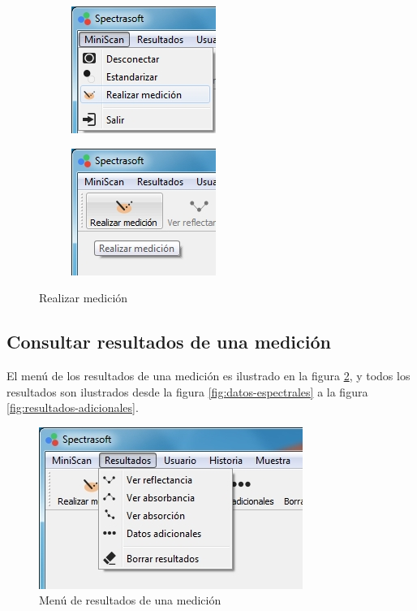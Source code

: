 \begin{figure}[H]
\centering
\begin{subfigure}{.5\textwidth}
  \centering
  \includegraphics[width=.6\linewidth]{./img/medir-menu.jpg}
\end{subfigure}%
\begin{subfigure}{.5\textwidth}
  \centering
  \includegraphics[width=.6\linewidth]{./img/medir-barra.jpg}
\end{subfigure}
\caption[]{Realizar medici\'{o}n\label{fig:medicion}}
\end{figure}

	\subsection*{Consultar resultados de una medici\'{o}n}
	
	El men\'{u} de los resultados de una medici\'{o}n es ilustrado en la figura \ref{fig:menu-resultados}, y todos los resultados son ilustrados desde la figura \ref{fig:datos-espectrales} a la figura \ref{fig:resultados-adicionales}.

\begin{figure}[H]
  \centering
  \includegraphics[width=.5\linewidth]{./img/resultados-menu.jpg}
\caption[]{Men\'{u} de resultados de una medici\'{o}n\label{fig:menu-resultados}}
\end{figure}

